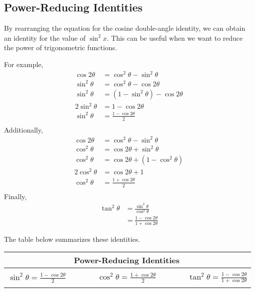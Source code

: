 \documentclass[11pt]{article}
\begin{document}
\subsection{Power-Reducing Identities}
By rearranging the equation for the cosine double-angle identity, we can obtain an identity for the value of $\sin^2x$. This can be useful when we want to reduce the power of trigonometric functions.

For example,
\begin{align*}
    \cos 2\theta &= \cos^2\theta - \sin^2\theta \\
    \sin^2 \theta &= \cos^2 \theta - \cos 2\theta \\
    \sin^2 \theta &= (1 - \sin^2 \theta) - \cos 2\theta \\
    2\sin^2 \theta &= 1 - \cos 2\theta \\
    \sin^2 \theta &= \frac{1 - \cos 2\theta}{2} \\
\end{align*}
Additionally,
\begin{align*}
    \cos 2\theta &= \cos^2\theta - \sin^2\theta \\
    \cos^2 \theta &= \cos 2\theta + \sin^2\theta \\ 
    \cos^2 \theta &= \cos 2\theta + (1 - \cos^2 \theta) \\
    2\cos^2 \theta &= \cos 2\theta + 1 \\
    \cos^2 \theta &= \frac{1 + \cos 2\theta}{2} \\
\end{align*}
Finally,
\begin{align*}
    \tan^2 \theta &= \frac{\sin^2 \theta}{\cos^2 \theta} \\
    &= \frac{1 - \cos 2\theta}{1 + \cos 2\theta}
\end{align*}

The table below summarizes these identities.
\begin{table}[H]
    \centering
    \begin{tabular}{|c c c|}
    \hline
     & Power-Reducing Identities & \\
     \hline
         &&\\
        $\displaystyle \sin^2\theta = \frac{1-\cos2\theta}{2}$\hspace{1cm} & $\displaystyle \cos^2\theta = \frac{1+\cos2\theta}{2}$\hspace{1cm}& $\displaystyle \tan^2\theta = \frac{1-\cos2\theta}{1+\cos2\theta}$\\
         &&\\
    \hline
    \end{tabular}
\end{table}
\end{document}
